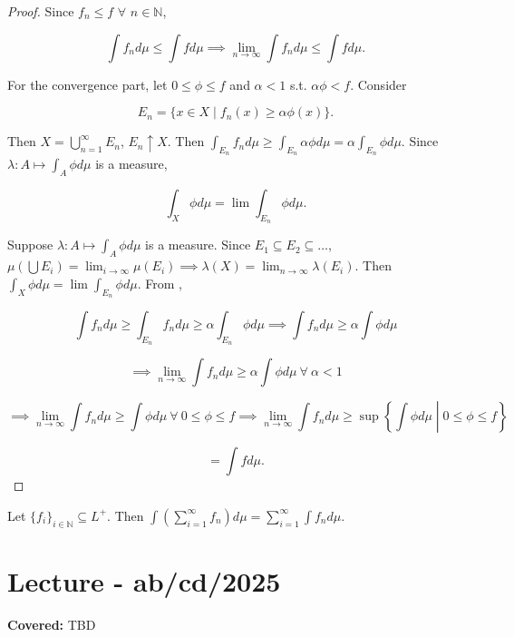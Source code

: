 \documentclass{functionspaces}
\begin{document}
\begin{proof}
Since $f_{n} \leq f$ $\forall$ $n \in \mathbb{N}$,

\[
\int f_{n} d\mu \leq \int f d\mu \implies \lim_{n \rightarrow \infty} \int f_{n} d\mu \leq \int f d\mu.
\]

For the convergence part, let $0 \leq \phi \leq f$ and $\alpha < 1$ s.t. $\alpha \phi < f.$ Consider

\[
E_{n} = \{x \in X \mid f_{n}(x) \geq \alpha \phi(x)\}.
\]

Then $X = \bigcup_{n=1}^{\infty} E_{n}$, $E_{n} \uparrow X.$ Then $\int_{E_{n}} f_{n} d\mu \geq \int_{E_{n}} \alpha \phi d\mu = \alpha \int_{E_{n}} \phi d\mu.$ Since $\lambda:A \mapsto \int_{A} \phi d\mu$ is a measure,

\[
\int_{X} \phi d\mu = \lim \int_{E_{n}} \phi d\mu.
\]

Suppose $\lambda:A \mapsto \int_{A} \phi d\mu$ is a measure. Since $E_{1} \subseteq E_{2} \subseteq \ldots$, $\mu(\bigcup E_{i}) = \lim_{i \rightarrow \infty} \mu(E_{i}) \implies \lambda(X) = \lim_{n \rightarrow \infty} \lambda(E_{i}).$ Then $\int_{X} \phi d\mu = \lim \int_{E_{n}} \phi d\mu.$ From ,

\[
\int f_{n} d\mu \geq \int_{E_{n}} f_{n} d\mu \geq \alpha \int_{E_{n}} \phi d\mu \implies \int f_{n} d\mu \geq \alpha \int \phi d\mu
\]

\[
\implies \lim_{n \rightarrow \infty} \int f_{n} d\mu \geq \alpha \int \phi d\mu\ \forall\ \alpha < 1
\]

\[
\implies \lim_{n \rightarrow \infty} \int f_{n} d\mu \geq \int \phi d\mu\ \forall\ 0 \leq \phi \leq f \implies \lim_{n \rightarrow \infty} \int f_{n} d\mu \geq \sup \left\{\int \phi d\mu \middle| 0 \leq \phi \leq f\right\}
\]

\[
= \int f d\mu.
\]
\end{proof}

\begin{proposition}
Let $\{f_{i}\}_{i \in \mathbb{N}} \subseteq L^{+}.$ Then $\int \left(\sum_{i=1}^{\infty} f_{n}\right) d\mu = \sum_{i=1}^{\infty} \int f_{n} d\mu.$
\end{proposition}

\endgroup

\newpage
\section{Lecture - ab/cd/2025}

\textbf{Covered:} TBD
\end{document}
